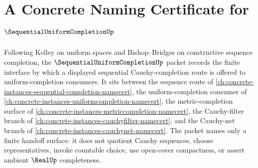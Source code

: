\chapter{A Concrete Naming Certificate for $\SequentialUniformCompletionUp$}
\label{ch:concrete-instances-sequential-uniform-completion-namecert}

Following Kelley on uniform spaces and Bishop--Bridges on constructive sequence completion, the $\SequentialUniformCompletionUp$ packet records the finite interface by which a displayed sequential Cauchy-completion route is offered to uniform-completion consumers. It sits between the sequence route of \autoref{ch:concrete-instances-sequential-completion-namecert}, the uniform-completion consumer of \autoref{ch:concrete-instances-uniformcompletion-namecert}, the metric-completion surface of \autoref{ch:concrete-instances-metriccompletion-namecert}, the Cauchy-filter branch of \autoref{ch:concrete-instances-cauchyfilter-namecert}, and the Cauchy-net branch of \autoref{ch:concrete-instances-cauchynet-namecert}. The packet names only a finite handoff surface: it does not quotient Cauchy sequences, choose representatives, invoke countable choice, use open-cover compactness, or assert ambient $\RealUp$ completeness.

